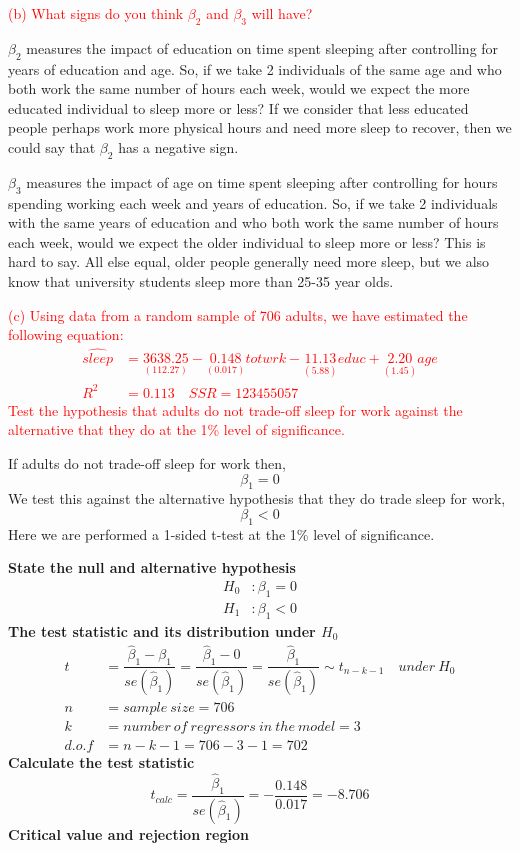 \documentclass[12pt]{report}
\begin{document}
\noindent \textcolor{red}{(b) What signs do you think $\beta_2$ and $\beta_3$ will have?}

\noindent $\beta_2$ measures the impact of education on time spent sleeping after controlling for years of education and age. So, if we take 2 individuals of the same age and who both work the same number of hours each week, would we expect the more educated individual to sleep more or less? If we consider that less educated people perhaps work more physical hours and need more sleep to recover, then we could say that $\beta_2$ has a negative sign.

\noindent $\beta_3$ measures the impact of age on time spent sleeping after controlling for hours spending working each week and years of education. So, if we take 2 individuals with the same years of education and who both work the same number of hours each week, would we expect the older individual to sleep more or less? This is hard to say. All else equal, older people generally need more sleep, but we also know that university students sleep more than 25-35 year olds.

\noindent \textcolor{red}{(c) Using data from a random sample of 706 adults, we have estimated the following equation: \begin{align}
	\widehat{sleep} &= \underset{(112.27)}{3638.25} - \underset{(0.017)}{0.148}totwrk - \underset{(5.88)}{11.13}educ + \underset{(1.45)}{2.20}age \\
	R^2 &= 0.113 \quad SSR = 123455057 \nonumber
	\end{align} Test the hypothesis that adults do not trade-off sleep for work against the alternative that they do at the 1\% level of significance.
}

\noindent If adults do not trade-off sleep for work then, $$\beta_1 = 0$$ We test this against the alternative hypothesis that they do trade sleep for work, $$\beta_1 < 0$$ Here we are performed a 1-sided t-test at the 1\% level of significance.

\noindent \textbf{State the null and alternative hypothesis}
\begin{align*}
H_0&: \beta_1 = 0 \\
H_1&: \beta_1 < 0
\end{align*}
\noindent \textbf{The test statistic and its distribution under $H_0$}
\begin{align*}
t &= \dfrac{\hat{\beta}_1 - \beta_1}{se(\hat{\beta}_1)} = \dfrac{\hat{\beta}_1 - 0}{se(\hat{\beta}_1)} = \dfrac{\hat{\beta}_1}{se(\hat{\beta}_1)} \sim t_{n-k-1} \quad under\ H_0 \\
n &= sample\ size = 706 \\
k &= number\ of\ regressors\ in\ the\ model = 3 \\
d.o.f &= n-k-1=706 - 3 - 1 = 702
\end{align*}
\noindent \textbf{Calculate the test statistic}
$$t_{calc} = \dfrac{\hat{\beta}_1}{se(\hat{\beta}_1)} = -\dfrac{0.148}{0.017} = -8.706$$
\noindent \textbf{Critical value and rejection region}
\end{document}
